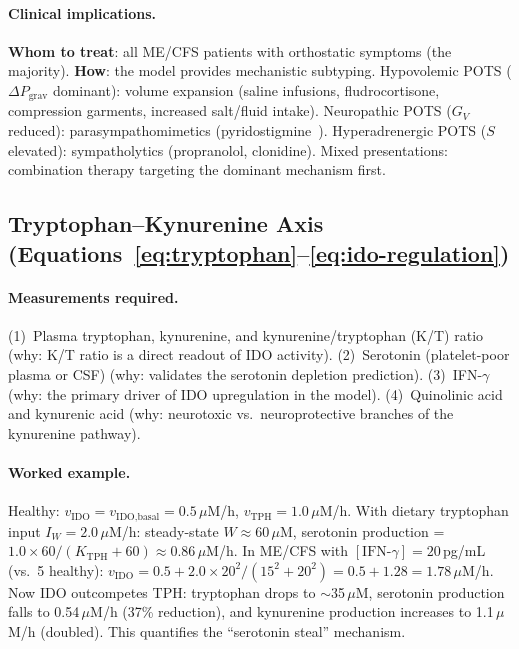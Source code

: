\paragraph{Clinical implications.}
\textbf{Whom to treat}: all ME/CFS patients with orthostatic symptoms (the majority). \textbf{How}: the model provides mechanistic subtyping. Hypovolemic POTS ($\Delta P_{\text{grav}}$ dominant): volume expansion (saline infusions, fludrocortisone, compression garments, increased salt/fluid intake). Neuropathic POTS ($G_V$ reduced): parasympathomimetics (pyridostigmine~\cite{Raj2005Pyridostigmine}). Hyperadrenergic POTS ($S$ elevated): sympatholytics (propranolol, clonidine). Mixed presentations: combination therapy targeting the dominant mechanism first.

\subsection{Tryptophan--Kynurenine Axis (Equations~\ref{eq:tryptophan}--\ref{eq:ido-regulation})}

\paragraph{Measurements required.}
(1)~Plasma tryptophan, kynurenine, and kynurenine/tryptophan (K/T) ratio (why: K/T ratio is a direct readout of IDO activity).
(2)~Serotonin (platelet-poor plasma or CSF) (why: validates the serotonin depletion prediction).
(3)~IFN-$\gamma$ (why: the primary driver of IDO upregulation in the model).
(4)~Quinolinic acid and kynurenic acid (why: neurotoxic vs.\ neuroprotective branches of the kynurenine pathway).

\paragraph{Worked example.}
Healthy: $v_{\text{IDO}} = v_{\text{IDO,basal}} = 0.5$\,$\mu$M/h, $v_{\text{TPH}} = 1.0$\,$\mu$M/h. With dietary tryptophan input $I_W = 2.0$\,$\mu$M/h: steady-state $W \approx 60$\,$\mu$M, serotonin production = $1.0 \times 60/(K_{\text{TPH}} + 60) \approx 0.86$\,$\mu$M/h. In ME/CFS with $[\text{IFN-}\gamma] = 20$\,pg/mL (vs.\ 5 healthy): $v_{\text{IDO}} = 0.5 + 2.0 \times 20^2/(15^2 + 20^2) = 0.5 + 1.28 = 1.78$\,$\mu$M/h. Now IDO outcompetes TPH: tryptophan drops to $\sim$35\,$\mu$M, serotonin production falls to 0.54\,$\mu$M/h (37\% reduction), and kynurenine production increases to 1.1\,$\mu$M/h (doubled). This quantifies the ``serotonin steal'' mechanism.


